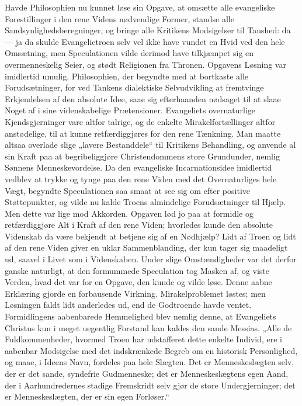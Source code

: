 \documentclass[12pt,a4paper]{book}
\begin{document}
Havde Philosophien nu kunnet løse sin Opgave, at omsætte alle evangeliske
Forestillinger i den rene Videns nødvendige Former, standse alle
Sandsynlighedsberegninger, og bringe alle Kritikens Modsigelser til Taushed: da
--- ja da skulde Evangelietroen selv vel ikke have vundet en Hvid ved den hele
Omsætning, men Speculationen vilde derimod have tilkjæmpet sig en
overmenneskelig Seier, og stødt Religionen fra Thronen. Opgavens Løsning var
imidlertid umulig. Philosophien, der begyndte med at bortkaste alle
Forudsætninger, for ved Tankens dialektiske Selvudvikling at fremtvinge
Erkjendelsen af den absolute Idee, saae sig efterhaanden nødsaget til at slaae
Noget af i sine videnskabelige Prætensioner. Evangeliets overnaturlige
Kjendsgjerninger vare altfor talrige, og de enkelte Mirakelfortællinger altfor
anstødelige, til at kunne retfærdiggjøres for den rene Tænkning. Man maatte
altsaa overlade slige „lavere Bestanddele“ til Kritikens Behandling, og anvende
al sin Kraft paa at begribeliggjøre Christendommens store Grundunder, nemlig
Sønnens Menneskevordelse. Da den evangeliske Incarnationsidee imidlertid vedblev
at trykke og tynge paa den rene Viden med det Overnaturliges hele Vægt, begyndte
Speculationen saa smaat at see sig om efter positive Støttepunkter, og vilde nu
kalde Troens almindelige Forudsætninger til Hjælp. Men dette var lige mod
Akkorden. Opgaven lød jo paa at formidle og retfærdiggjøre Alt i Kraft af den
rene Viden; hvorledes kunde den absolute Videnskab da være bekjendt at betjene
sig af en Nødhjælp? Lidt af Troen og lidt af den rene Viden giver en uklar
Sammenblanding, der kun tager sig maadeligt ud, saavel i Livet som i
Videnskaben. Under slige Omstændigheder var det derfor ganske naturligt, at den
formummede Speculation tog Masken af, og viste Verden, hvad det var for en
Opgave, den kunde og vilde løse. Denne aabne Erklæring gjorde en forbausende
Virkning. Mirakelproblemet løstes; men Løsningen faldt lidt anderledes ud, end
de Godtroende havde ventet. Formidlingens aabenbarede Hemmelighed blev nemlig
denne, at Evangeliets Christus kun i meget uegentlig Forstand kan kaldes den
sande Messias. „Alle de Fuldkommenheder, hvormed Troen har udstafferet dette
enkelte Individ, ere i aabenbar Modsigelse med det indskrænkede Begreb om en
historisk Personlighed, og maae, i Ideens Navn, fordeles paa hele Slægten. Det
er Menneskeslægten selv, der er det sande, syndefrie Gudmenneske; det er
Menneskeslægtens egen Aand, der i Aarhundredernes stadige Fremskridt selv gjør
de store Undergjerninger; det er Menneskeslægten, der er sin egen Forløser.“
\end{document}
